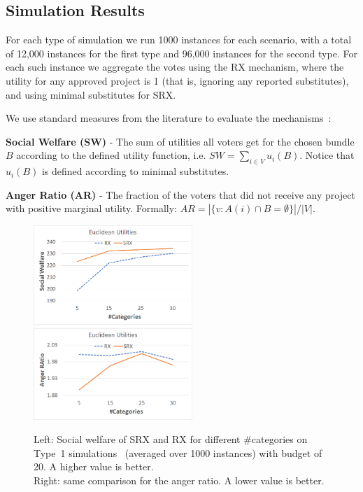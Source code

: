 \documentclass[runningheads]{llncs}
\begin{document}
\subsection{Simulation Results}

For each  type of simulation we run 1000 instances for each scenario, with a total of 12,000 instances for the first type and 96,000 instances for the second type. For each such instance we aggregate the votes using the RX mechanism, where the utility for any approved project is 1 (that is, ignoring any reported substitutes),  and using minimal substitutes for SRX.


We use standard measures from the literature to evaluate the mechanisms~\cite{skowron2020participatory}:

\textbf{Social Welfare (SW)} - The sum of utilities all voters get for the chosen bundle $B$ according to the defined utility function, i.e. $SW = \sum_{i\in V}u_i(B)$. Notice that $u_i(B)$ is defined according to minimal substitutes.

\textbf{Anger Ratio (AR)} - The fraction of the voters that did not receive any project with positive marginal utility. Formally: $AR=|\{v:A(i)\cap B=\emptyset\}|/|V|$.

\begin{figure}[t]
\begin{center}
\includegraphics[width=6cm]{simulation/unit_cost_single_sw.png}
\includegraphics[width=6cm]{simulation/unit_cost_single_ar.png}
\caption{Left: Social welfare  of SRX and RX for different \#categories on Type~1 simulations~ (averaged over 1000 instances) with budget of 20. A higher value is better.\\
 Right: same comparison for the anger ratio. A lower value is better.
}\label{fig:type1}
\end{center}
\end{figure}
\end{document}
